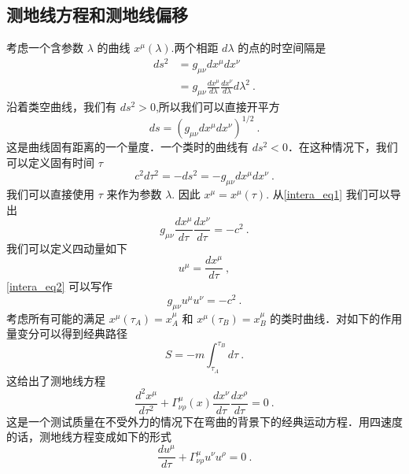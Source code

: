 \subsection{测地线方程和测地线偏移}
考虑一个含参数 $\lambda$ 的曲线 $x^\mu(\lambda)$.两个相距 $d\lambda$ 的点的时空间隔是
\begin{equation}
\begin{aligned}
ds^2 & = g_{\mu\nu}  dx^\mu dx^\nu \\
& = g_{\mu\nu } \frac{dx^\mu}{d\lambda} \frac{dx^\nu}{d\lambda} d \lambda^2~.
\end{aligned}
\end{equation}
沿着类空曲线，我们有 $ds^2>0$,所以我们可以直接开平方
\begin{equation}
ds = (g_{\mu\nu } dx^\mu dx^\nu )^{1/2}~. 
\end{equation}
这是曲线固有距离的一个量度．一个类时的曲线有 $ds^2<0$．在这种情况下，我们可以定义固有时间 $\tau$
\begin{equation}\label{intera_eq1}
c^2 d \tau^2  = - ds^2 = - g_{\mu\nu} dx^\mu dx^\nu ~. 
\end{equation}
我们可以直接使用 $\tau$ 来作为参数 $\lambda$. 因此 $x^\mu = x^\mu(\tau)$. 从\autoref{intera_eq1} 我们可以导出
\begin{equation}\label{intera_eq2}
g_{\mu\nu} \frac{dx^\mu}{d\tau} \frac{dx^\nu}{d\tau} = - c^2~. 
\end{equation}
我们可以定义四动量如下
\begin{equation}
u^\mu = \frac{d x^\mu}{d \tau} ~,
\end{equation}
\autoref{intera_eq2} 可以写作
\begin{equation}
g_{\mu\nu} u^\mu u^\nu = - c^2~.
\end{equation}
考虑所有可能的满足 $x^\mu(\tau_A)=x^\mu_{A}$ 和 $x^\mu(\tau_B) = x^\mu_{B}$ 的类时曲线．对如下的作用量变分可以得到经典路径
\begin{equation}
S = - m \int_{\tau_A}^{\tau_B} d \tau~. 
\end{equation}
这给出了测地线方程
\begin{equation}\label{intera_eq3}
\frac{d^2 x^\mu}{d \tau^2} + \Gamma^\mu_{\nu\rho} (x) \frac{dx^\nu}{d \tau} \frac{dx^\rho}{d\tau} = 0~. 
\end{equation}
这是一个测试质量在不受外力的情况下在弯曲的背景下的经典运动方程．用四速度的话，测地线方程变成如下的形式
\begin{equation}
\frac{du^\mu}{d\tau} + \Gamma^\mu_{\nu\rho} u^\nu u^\rho = 0~.
\end{equation}
